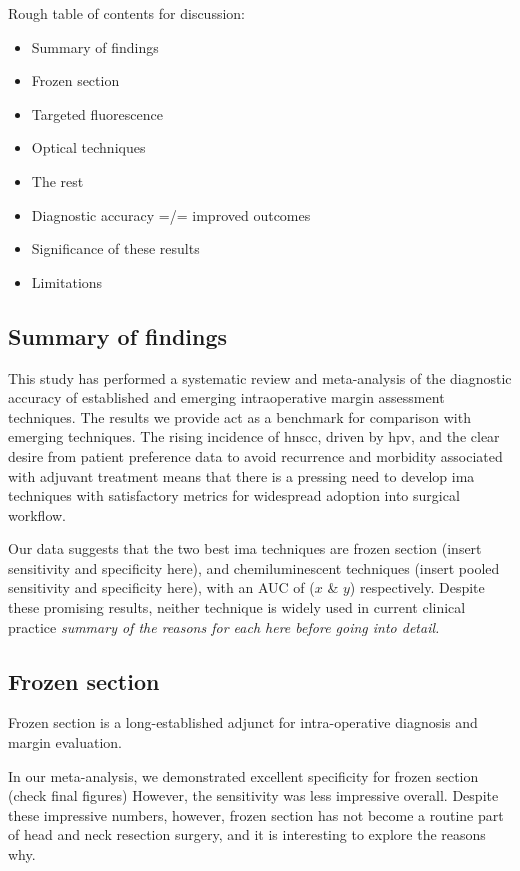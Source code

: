 Rough table of contents for discussion:
\begin{itemize}
\item Summary of findings
\item Frozen section
\item Targeted fluorescence
\item Optical techniques
\item The rest
\item Diagnostic accuracy =/= improved outcomes
\item Significance of these results
\item Limitations
\end{itemize}
 
\subsection{Summary of findings}

This study has performed a systematic review and meta-analysis of the diagnostic accuracy of established and emerging intraoperative margin assessment techniques.
The results we provide act as a benchmark for comparison with emerging techniques.
The rising incidence of \gls{hnscc}, driven by \gls{hpv}, and the clear desire from patient preference data to avoid recurrence and morbidity associated with adjuvant treatment means that there is a pressing need to develop \gls{ima} techniques with satisfactory metrics for widespread adoption into surgical workflow.

Our data suggests that the two best \gls{ima} techniques are frozen section (insert sensitivity and specificity here), and chemiluminescent techniques (insert pooled sensitivity and specificity here), with an AUC of ($x$ \& $y$) respectively.
Despite these promising results, neither technique is widely used in current clinical practice
\emph{summary of the reasons for each here before going into detail.}

\subsection{Frozen section}

Frozen section is a long-established adjunct for intra-operative diagnosis and margin evaluation.

In our meta-analysis, we demonstrated excellent specificity for frozen section (check final figures)
However, the sensitivity was less impressive overall.
Despite these impressive numbers, however, frozen section has not become a routine part of head and neck resection surgery, and it is interesting to explore the reasons why.

